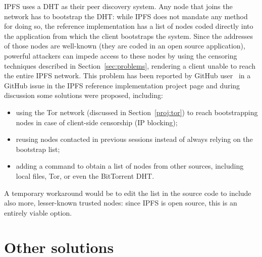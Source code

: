 \documentclass[mscthesis]{usiinfthesis}
\begin{document}
IPFS uses a DHT as their peer discovery system. Any node that joins the network has to bootstrap the DHT: while IPFS does not mandate any method for doing so, the reference implementation has a list of nodes coded directly into the application from which the client bootstraps the system. Since the addresses of those nodes are well-known (they are coded in an open source application), powerful attackers can impede access to these nodes by using the censoring techniques described in Section~\ref{sec:problems}, rendering a client unable to reach the entire IPFS network. This problem has been reported by GitHub user~\cite{website:ipfsbootstrap} in a GitHub issue in the IPFS reference implementation project page and during discussion some solutions were proposed, including:
\begin{itemize}
	\item using the Tor network (discussed in Section~\ref{proj:tor}) to reach bootstrapping nodes in case of client-side censorship (IP blocking);
	\item reusing nodes contacted in previous sessions instead of always relying on the bootstrap list;
	\item adding a command to obtain a list of nodes from other sources, including local files, Tor, or even the BitTorrent DHT.
\end{itemize}
A temporary workaround would be to edit the list in the source code to include also more, lesser-known trusted nodes: since IPFS is open source, this is an entirely viable option.

\section{Other solutions}
\end{document}
